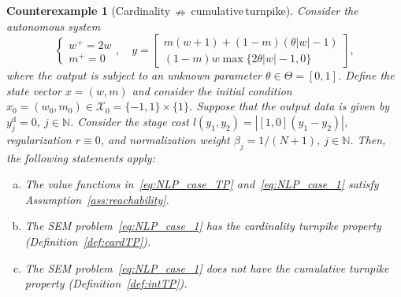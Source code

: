 \documentclass[a4paper,fleqn]{cas-dc}
\newtheorem{cexample}{Counterexample}
\begin{document}
\begin{cexample}[Cardinality{\,}$\nRightarrow${\,}cumulative{\,}turnpike]\label{counterex}
	Consider the autonomous system
	\begin{equation*}
		\left\{
		\begin{matrix}
			w^+ = 2w\\
			m^+ = 0
		\end{matrix}
		\right.,
		\quad
		y =
		\begin{bmatrix}
			m(w+1) + (1-m)(\theta|w|-1)\\ (1-m)w\max\{2\theta|w|-1,0\}
		\end{bmatrix},
	\end{equation*}
	where the output is subject to an unknown parameter $\theta\in\Theta=[0,1]$.
	Define the state vector $x = (w,m)$ and consider the initial condition $x_0 = (w_0,m_0) \in\mathcal{X}_0= \{-1,1\}\times\{1\}$.
	Suppose that the output data is given by $y^\mathrm{d}_j = 0$, $j\in\mathbb{N}$. Consider the stage cost $l(y_1,y_2) = |[1,0](y_1-y_2)|$, regularization $r\equiv0$, and normalization weight $\beta_j = 1/(N+1)$, $j\in\mathbb{N}$.
	Then, the following statements apply:
	\begin{enumerate}[a)]
		\item The value functions in~\eqref{eq:NLP_case_TP} and~\eqref{eq:NLP_case_1} satisfy Assumption~\ref{ass:reachability}.
		
		\item The SEM problem~\eqref{eq:NLP_case_1} has the cardinality turnpike property (Definition~\ref{def:cardTP}).
		
		\item The SEM problem~\eqref{eq:NLP_case_1} does not have the cumulative turnpike property (Definition~\ref{def:intTP}).
	\end{enumerate}
\end{cexample}
\end{document}

